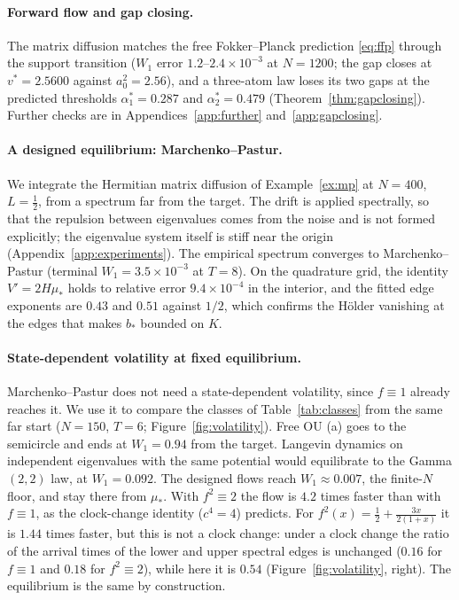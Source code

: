 \documentclass[11pt]{article}
\theoremstyle{plain}
\theoremstyle{definition}
\theoremstyle{remark}
\begin{document}
\paragraph{Forward flow and gap closing.}\label{sec:transition-para} The matrix diffusion matches the
free Fokker--Planck prediction \eqref{eq:ffp} through the support transition ($W_1$ error
$1.2$--$2.4\times10^{-3}$ at $N=1200$; the gap closes at $v^*=2.5600$ against $a_0^2=2.56$), and a
three-atom law loses its two gaps at the predicted thresholds $\alpha_1^*=0.287$ and $\alpha_2^*=0.479$
(Theorem~\ref{thm:gapclosing}). Further checks are in Appendices~\ref{app:further} and~\ref{app:gapclosing}.

\paragraph{A designed equilibrium: Marchenko--Pastur.} We integrate the Hermitian matrix diffusion of
Example~\ref{ex:mp} at $N=400$, $L=\tfrac12$, from a spectrum far from the target. The drift is applied
spectrally, so that the repulsion between eigenvalues comes from the noise and is not formed
explicitly; the eigenvalue system itself is stiff near the origin (Appendix~\ref{app:experiments}). The
empirical spectrum converges to Marchenko--Pastur (terminal $W_1=3.5\times10^{-3}$ at $T=8$). On the
quadrature grid, the identity $V'=2H\mu_*$ holds to relative error $9.4\times10^{-4}$ in the
interior, and the fitted edge exponents are $0.43$ and $0.51$ against $1/2$, which confirms the
Hölder vanishing at the edges that makes $b_*$ bounded on $K$.

\paragraph{State-dependent volatility at fixed equilibrium.} Marchenko--Pastur does not need a state-dependent volatility, since $f\equiv1$ already reaches it. We use it to compare the classes of
Table~\ref{tab:classes} from the same far start ($N=150$, $T=6$; Figure~\ref{fig:volatility}). Free OU (a)
goes to the semicircle and ends at $W_1=0.94$ from the target. Langevin dynamics on independent
eigenvalues with the same potential would equilibrate to the Gamma$(2,2)$ law, at $W_1=0.092$. The
designed flows reach $W_1\approx0.007$, the finite-$N$ floor, and stay there from $\mu_*$. With $f^2\equiv2$ the flow is $4.2$ times faster than with $f\equiv1$, as the
clock-change identity ($c^4=4$) predicts. For $f^2(x)=\tfrac12+\tfrac{3x}{2(1+x)}$ it is $1.44$ times
faster, but this is not a clock change: under a clock change the ratio of the arrival times of the
lower and upper spectral edges is unchanged ($0.16$ for $f\equiv1$ and $0.18$ for $f^2\equiv2$), while
here it is $0.54$ (Figure~\ref{fig:volatility}, right). The equilibrium is the same by construction.
\end{document}
